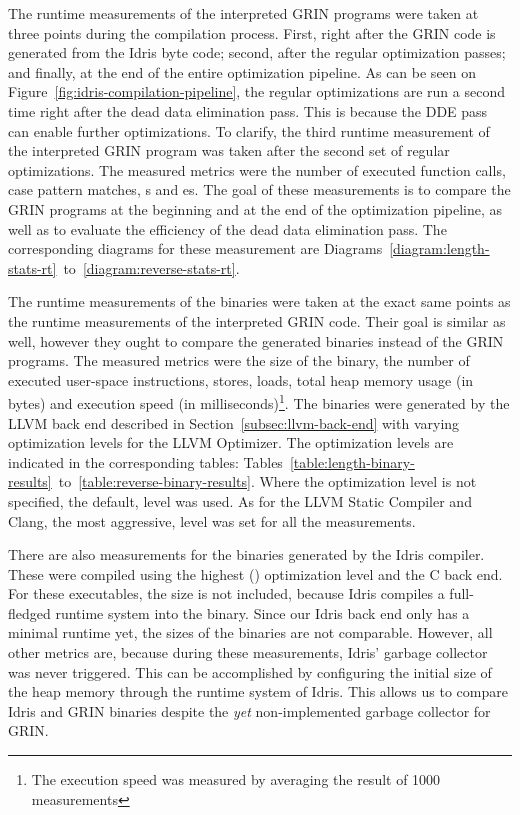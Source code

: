 \documentclass[main.tex]{subfiles}
\begin{document}
	The runtime measurements of the interpreted GRIN programs were taken at three points during the compilation process. First, right after the GRIN code is generated from the Idris byte code; second, after the regular optimization passes; and finally, at the end of the entire optimization pipeline. As can be seen on Figure~\ref{fig:idris-compilation-pipeline}, the regular optimizations are run a second time right after the dead data elimination pass. This is because the DDE pass can enable further optimizations. To clarify, the third runtime measurement of the interpreted GRIN program was taken after the second set of regular optimizations. The measured metrics were the number of executed function calls, case pattern matches, s and es. The goal of these measurements is to compare the GRIN programs at the beginning and at the end of the optimization pipeline, as well as to evaluate the efficiency of the dead data elimination pass. The corresponding diagrams for these measurement are Diagrams~\ref{diagram:length-stats-rt}~to~\ref{diagram:reverse-stats-rt}.


	The runtime measurements of the binaries were taken at the exact same points as the runtime measurements of the interpreted GRIN code. Their goal is similar as well, however they ought to compare the generated binaries instead of the GRIN programs. The measured metrics were the size of the binary, the number of executed user-space instructions, stores, loads, total heap memory usage (in bytes) and execution speed (in milliseconds)\footnote{The execution speed was measured by averaging the result of 1000 measurements}. The binaries were generated by the LLVM back end described in Section~\ref{subsec:llvm-back-end} with varying optimization levels for the LLVM Optimizer. The optimization levels are indicated in the corresponding tables: Tables~\ref{table:length-binary-results}~to~\ref{table:reverse-binary-results}. Where the optimization level is not specified, the default,  level was used. As for the LLVM Static Compiler and Clang, the most aggressive,  level was set for all the measurements.
	
	There are also measurements for the binaries generated by the Idris compiler. These were compiled using the highest () optimization level and the C back end. For these executables, the size is not included, because Idris compiles a full-fledged runtime system into the binary. Since our Idris back end only has a minimal runtime yet, the sizes of the binaries are not comparable. However, all other metrics are, because during these measurements, Idris' garbage collector was never triggered. This can be accomplished by configuring the initial size of the heap memory through the runtime system of Idris. This allows us to compare Idris and GRIN binaries despite the \emph{yet} non-implemented garbage collector for GRIN.
	
\end{document}
